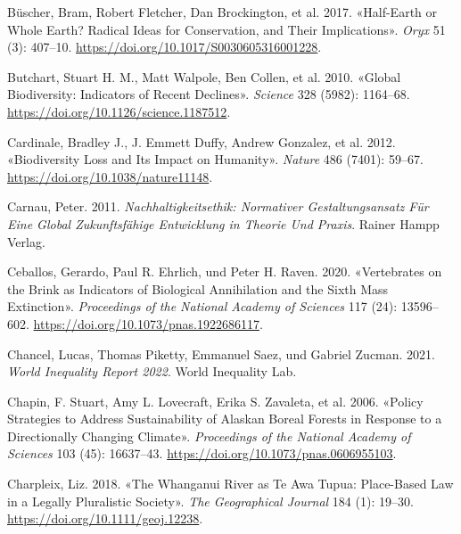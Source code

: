 \documentclass[
  nswissgerman,
  a4paper,
  DIV=11,
  numbers=noendperiod,
  oneside,
  openany]{scrreprt}
\newlength{\cslhangindent}
\newenvironment{CSLReferences}[2] %
 {\begin{list}{}{%
  \setlength{\itemindent}{0pt}
  \setlength{\leftmargin}{0pt}
  \setlength{\parsep}{0pt}
  \ifodd #1
   \setlength{\leftmargin}{\cslhangindent}
   \setlength{\itemindent}{-1\cslhangindent}
  \fi
  \setlength{\itemsep}{#2\baselineskip}}}
 {\end{list}}
\begin{document}
\begin{CSLReferences}{1}{1}
Büscher, Bram, Robert Fletcher, Dan Brockington, et al. 2017.
{«Half-{Earth} or {Whole Earth}? {Radical} Ideas for Conservation, and
Their Implications»}. \emph{Oryx} 51 (3): 407--10.
\url{https://doi.org/10.1017/S0030605316001228}.

{Butchart, Stuart H. M., Matt Walpole, Ben Collen, et al.} 2010.
{«Global {Biodiversity}: {Indicators} of {Recent Declines}»}.
\emph{Science} 328 (5982): 1164--68.
\url{https://doi.org/10.1126/science.1187512}.

Cardinale, Bradley J., J. Emmett Duffy, Andrew Gonzalez, et al. 2012.
{«Biodiversity Loss and Its Impact on Humanity»}. \emph{Nature} 486
(7401): 59--67. \url{https://doi.org/10.1038/nature11148}.

Carnau, Peter. 2011. \emph{Nachhaltigkeitsethik: {Normativer
Gestaltungsansatz} F{ü}r Eine Global Zukunftsf{ä}hige {Entwicklung} in
{Theorie} Und {Praxis}}. Rainer Hampp Verlag.

Ceballos, Gerardo, Paul R. Ehrlich, und Peter H. Raven. 2020.
{«Vertebrates on the Brink as Indicators of Biological Annihilation and
the Sixth Mass Extinction»}. \emph{Proceedings of the National Academy
of Sciences} 117 (24): 13596--602.
\url{https://doi.org/10.1073/pnas.1922686117}.

Chancel, Lucas, Thomas Piketty, Emmanuel Saez, und Gabriel Zucman. 2021.
\emph{World {Inequality Report} 2022}. World Inequality Lab.

Chapin, F. Stuart, Amy L. Lovecraft, Erika S. Zavaleta, et al. 2006.
{«Policy Strategies to Address Sustainability of {Alaskan} Boreal
Forests in Response to a Directionally Changing Climate»}.
\emph{Proceedings of the National Academy of Sciences} 103 (45):
16637--43. \url{https://doi.org/10.1073/pnas.0606955103}.

Charpleix, Liz. 2018. {«The {Whanganui River} as {Te Awa Tupua}:
{Place-Based} Law in a Legally Pluralistic Society»}. \emph{The
Geographical Journal} 184 (1): 19--30.
\url{https://doi.org/10.1111/geoj.12238}.


\end{CSLReferences}
\end{document}
